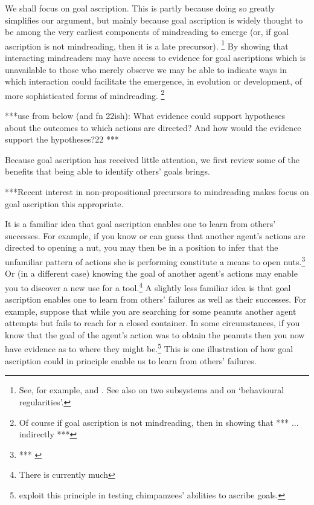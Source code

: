 \documentclass[14pt,a4paper]{extarticle}
\begin{document}
We shall focus on goal ascription.
This is partly because doing so  greatly simplifies our argument,
but mainly because goal ascription is widely thought to be among the very earliest components of mindreading to emerge (or, if goal ascription is not mindreading, then it is a late precursor).%
\footnote{
See, for example,
\citet{Gergely:1995sq} and 
\citet{Woodward:1998dm}.
See also
\citet[p.\ 111, Box 1]{Baillargeon:gx}
on two subsystems
and 
\citet{Povinelli:2001jf} on `behavioural regularities'.
}
By showing that
  interacting mindreaders may have access to 
  evidence for goal ascriptions 
  which is unavailable to those who merely observe
we may be able to indicate ways in which interaction could facilitate the emergence, in evolution or development, of more sophisticated forms of mindreading.%
\footnote{
Of course if goal ascription is not mindreading,
then in showing that ***
... indirectly ***
}   


***use from below (and fn 22ish):
What evidence could support hypotheses about the outcomes to which actions are directed? And how would the evidence support the hypotheses?22
***



Because goal ascription has received little attention,
we  first review some of the benefits that being able to identify others' goals brings.

***Recent interest in non-propositional precursors to mindreading makes focus on goal ascription this appropriate.



It is a familiar idea that goal ascription enables one to learn from others' successes.
For example,
if you know or can guess that another agent's actions are directed to opening a nut,
you may then be in a position to infer that the unfamiliar pattern of actions she is performing constitute a means to open nuts.\footnote{
***
\citep{Horner:2005pj}
}
Or (in a different case) knowing the goal of another agent's actions may enable you to discover a new use for a tool.\footnote{
There is currently much 
}
A slightly less familiar idea is that goal ascription enables one to learn from others' failures as well as their successes.
For example, suppose that while you are searching for some peanuts 
another agent attempts but fails to reach for a closed container.
In some circumstances,
if you know that the goal of the agent's action was to obtain the peanuts
then you now have evidence as to where they might be.\footnote{
\citet{hare_chimpanzees_2004} exploit this principle in testing chimpanzees' abilities to ascribe goals.
}
This is one illustration of how goal ascription could in principle enable us to learn from others' failures.
\end{document}
